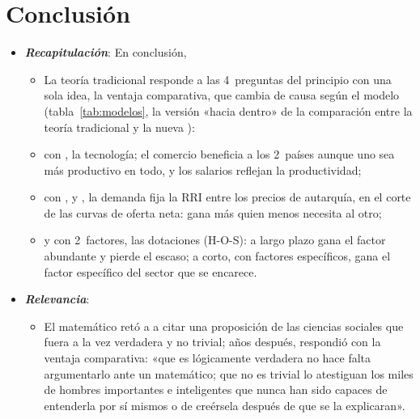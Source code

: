 \documentclass[11pt]{article}
\begin{document}
\section*{Conclusión}

\begin{itemize}
\item \textbf{\emph{Recapitulación}}: En conclusión,
  \begin{itemize}
  \item La teoría tradicional responde a las 4~preguntas del principio con una sola idea, la ventaja comparativa, que cambia de causa según el modelo (tabla~\ref{tab:modelos}, la versión «hacia dentro» de la comparación entre la teoría tradicional y la nueva ):
  \item con , la tecnología; el comercio beneficia a los 2~países aunque uno sea más productivo en todo, y los salarios reflejan la productividad;
  \item con ,  y , la demanda fija la RRI entre los precios de autarquía, en el corte de las curvas de oferta neta: gana más quien menos necesita al otro;
  \item y con 2~factores, las dotaciones (H-O-S): a largo plazo gana el factor abundante y pierde el escaso; a corto, con factores específicos, gana el factor específico del sector que se encarece.
  \end{itemize}
\item \textbf{\emph{Relevancia}}:
  \begin{itemize}
  \item El matemático  retó a  a citar una proposición de las ciencias sociales que fuera a la vez verdadera y no trivial; años después,  respondió con la ventaja comparativa: «que es lógicamente verdadera no hace falta argumentarlo ante un matemático; que no es trivial lo atestiguan los miles de hombres importantes e inteligentes que nunca han sido capaces de entenderla por sí mismos o de creérsela después de que se la explicaran»\nocite{Samuelson1969Way}.


\end{itemize}
\end{itemize}
\end{document}
